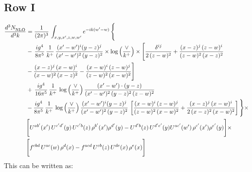 \documentclass[9pt]{article}
\numberwithin{equation}{section}
\begin{document}
\subsection{Row I}
\begin{align}
     \frac{d^{3}N_{\rm NLO}^{\rm}}{d^{3}k}  & =   \frac{1}{(2\pi)^{3}}\, \int_{x,y,x',z,w,w^{\prime}} e^{-ik(w^{\prime}-w)}\, \Bigg\{\notag \\
& -\,\frac{ig^{4}}{8\pi^{5}}\,\frac{1}{k^{+}}\,\frac{(x'-w')^{i}(y-z)^{j}}{(x'-w')^{2}\,(y-z)^{2}}\times \log{\left(\frac{\vee}{k^{+}}\right)}\times \Bigg[\frac{\delta^{ij}}{2\,(z-w)^{2}}+\frac{(x-z)^{j}\,(z-w)^{i}}{(z-w)^{2}\,(x-z)^{2}}\notag \\ & -\frac{(x-z)^{j}\,(x-w)^{i}}{(x-w)^{2}\,(x-z)^{2}}-\frac{(x-w)^{i}\,(z-w)^{j}}{(z-w)^{2}\,(x-w)^{2}}\Bigg] \notag \\
& +\,\frac{ig^{4}}{16\pi^{5}}\,\frac{1}{k^{+}}\,\log{\left(\frac{\vee}{k^{+}}\right)}\, \frac{(x'-w')\cdot (y-z)}{(x'-w')^{2}\,(y-z)^{2}\,(z-w)^{2}} \notag \\
& -\frac{ig^{4}}{8\pi^{5}}\,\frac{1}{k^{+}}\,\log{\left(\frac{\vee}{k^{+}}\right)}\,\frac{(x'-w')^{i}(y-z)^{j}}{(x'-w')^{2}\,(y-z)^{2}}\,\left[\frac{(x-w)^{i}\,(z-w)^{j}}{(z-w)^{2}\,(x-w)^{2}}+\frac{(x-z)^{j}\,(x-w)^{i}}{2\,(x-z)^{2}\, (x-w)^{2}}\right]\Bigg\}\times \notag \\ &  \Bigg[U^{ab'}(x')\,U^{c'd'}(y)\,U^{c'b}(z)\,\rho^{b'}(x')\rho^{d'}(y)-U^{d'b}(z)\,U^{d'e'}(y)U^{ac'}(w')\,\rho^{c'}(x')\rho^{e'}(y)\Bigg]\times\notag \\ & \Bigg[f^{cbd}\,U^{ac}(w)\,\rho^{d}(x)-f^{acd}\, U^{cb}(z)\,U^{de}(x)\,\rho^{e}(x)\Bigg]
\end{align}
This can be written as: 
\end{document}
